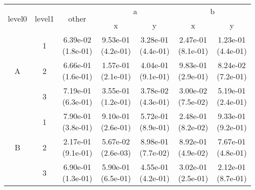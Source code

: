 \begin{tabular}{ccccccc}
\toprule
\multirow{2}{*}{level0} & \multirow{2}{*}{level1}& \multirow{2}{*}{other}&\multicolumn{2}{c}{a}&\multicolumn{2}{c}{b}\tabularnewline
\cmidrule(lr){4-5}
\cmidrule(lr){6-7}
&&&x&y&x&y\tabularnewline
\midrule
\multirow{3}{*}{A}&1& 6.39e-02 (1.8e-01)& 9.53e-01 (4.2e-01)& 3.28e-01 (4.4e-01)& 2.47e-01 (8.1e-01)& 1.23e-01 (4.4e-01)\tabularnewline
&2& 6.66e-01 (1.6e-01)& 1.57e-01 (2.1e-01)& 4.04e-01 (9.1e-01)& 9.83e-01 (2.9e-01)& 8.24e-02 (7.2e-01)\tabularnewline
&3& 7.19e-01 (6.3e-01)& 3.55e-01 (1.2e-01)& 3.78e-02 (4.3e-01)& 3.00e-02 (7.5e-02)& 5.19e-01 (2.4e-01)\tabularnewline
\midrule
\multirow{3}{*}{B}&1& 7.90e-01 (3.8e-01)& 9.10e-01 (2.6e-01)& 5.72e-01 (8.9e-01)& 2.48e-01 (8.2e-02)& 9.33e-01 (9.2e-01)\tabularnewline
&2& 2.17e-01 (9.1e-01)& 5.67e-02 (2.6e-03)& 8.98e-01 (7.7e-02)& 8.92e-01 (4.9e-02)& 7.67e-01 (4.8e-01)\tabularnewline
&3& 6.90e-01 (1.3e-01)& 5.90e-01 (6.5e-01)& 4.55e-01 (4.2e-01)& 3.02e-01 (2.5e-01)& 2.12e-01 (8.7e-01)\tabularnewline
\bottomrule
\end{tabular}
